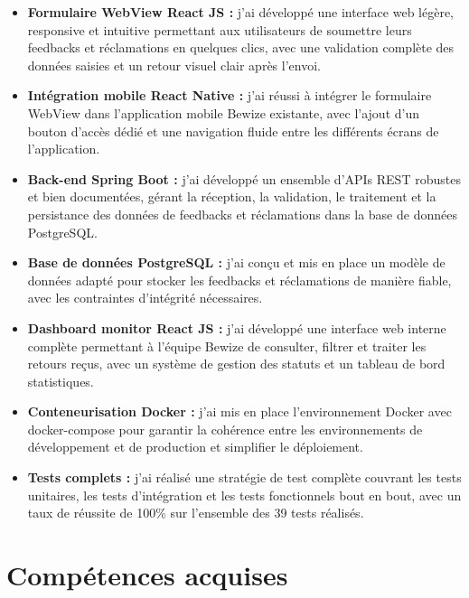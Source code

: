 \begin{itemize}
    \item \textbf{Formulaire WebView React JS :} j'ai développé une 
    interface web légère, responsive et intuitive permettant aux 
    utilisateurs de soumettre leurs feedbacks et réclamations en 
    quelques clics, avec une validation complète des données saisies 
    et un retour visuel clair après l'envoi.
    
    \item \textbf{Intégration mobile React Native :} j'ai réussi 
    à intégrer le formulaire WebView dans l'application mobile Bewize 
    existante, avec l'ajout d'un bouton d'accès dédié et une navigation 
    fluide entre les différents écrans de l'application.
    
    \item \textbf{Back-end Spring Boot :} j'ai développé un ensemble 
    d'APIs REST robustes et bien documentées, gérant la réception, 
    la validation, le traitement et la persistance des données de 
    feedbacks et réclamations dans la base de données PostgreSQL.
    
    \item \textbf{Base de données PostgreSQL :} j'ai conçu et mis 
    en place un modèle de données adapté pour stocker les feedbacks 
    et réclamations de manière fiable, avec les contraintes d'intégrité 
    nécessaires.
    
    \item \textbf{Dashboard monitor React JS :} j'ai développé une 
    interface web interne complète permettant à l'équipe Bewize de 
    consulter, filtrer et traiter les retours reçus, avec un système 
    de gestion des statuts et un tableau de bord statistiques.
    
    \item \textbf{Conteneurisation Docker :} j'ai mis en place 
    l'environnement Docker avec docker-compose pour garantir la 
    cohérence entre les environnements de développement et de 
    production et simplifier le déploiement.
    
    \item \textbf{Tests complets :} j'ai réalisé une stratégie 
    de test complète couvrant les tests unitaires, les tests 
    d'intégration et les tests fonctionnels bout en bout, avec 
    un taux de réussite de 100\% sur l'ensemble des 39 tests réalisés.
\end{itemize}

\section{Compétences acquises}

